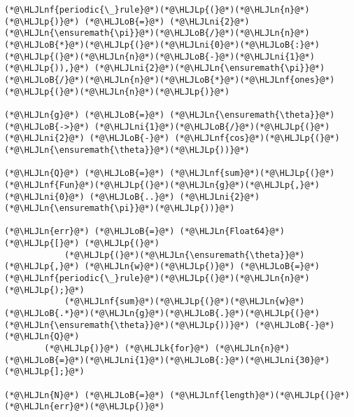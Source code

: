 \documentclass[12pt,a4paper]{article}
\newcommand{\HLJLk}[1]{\textcolor[RGB]{148,91,176}{\textbf{#1}}}
\newcommand{\HLJLn}[1]{#1}
\newcommand{\HLJLnf}[1]{\textcolor[RGB]{66,102,213}{#1}}
\newcommand{\HLJLni}[1]{\textcolor[RGB]{59,151,46}{#1}}
\newcommand{\HLJLoB}[1]{\textcolor[RGB]{102,102,102}{\textbf{#1}}}
\newcommand{\HLJLp}[1]{#1}
\begin{document}
\begin{lstlisting}
(*@\HLJLnf{periodic{\_}rule}@*)(*@\HLJLp{(}@*)(*@\HLJLn{n}@*)(*@\HLJLp{)}@*) (*@\HLJLoB{=}@*) (*@\HLJLni{2}@*)(*@\HLJLn{\ensuremath{\pi}}@*)(*@\HLJLoB{/}@*)(*@\HLJLn{n}@*)(*@\HLJLoB{*}@*)(*@\HLJLp{(}@*)(*@\HLJLni{0}@*)(*@\HLJLoB{:}@*)(*@\HLJLp{(}@*)(*@\HLJLn{n}@*)(*@\HLJLoB{-}@*)(*@\HLJLni{1}@*)(*@\HLJLp{)),}@*) (*@\HLJLni{2}@*)(*@\HLJLn{\ensuremath{\pi}}@*)(*@\HLJLoB{/}@*)(*@\HLJLn{n}@*)(*@\HLJLoB{*}@*)(*@\HLJLnf{ones}@*)(*@\HLJLp{(}@*)(*@\HLJLn{n}@*)(*@\HLJLp{)}@*)

(*@\HLJLn{g}@*) (*@\HLJLoB{=}@*) (*@\HLJLn{\ensuremath{\theta}}@*) (*@\HLJLoB{->}@*) (*@\HLJLni{1}@*)(*@\HLJLoB{/}@*)(*@\HLJLp{(}@*)(*@\HLJLni{2}@*) (*@\HLJLoB{-}@*) (*@\HLJLnf{cos}@*)(*@\HLJLp{(}@*)(*@\HLJLn{\ensuremath{\theta}}@*)(*@\HLJLp{))}@*)

(*@\HLJLn{Q}@*) (*@\HLJLoB{=}@*) (*@\HLJLnf{sum}@*)(*@\HLJLp{(}@*)(*@\HLJLnf{Fun}@*)(*@\HLJLp{(}@*)(*@\HLJLn{g}@*)(*@\HLJLp{,}@*) (*@\HLJLni{0}@*) (*@\HLJLoB{..}@*) (*@\HLJLni{2}@*)(*@\HLJLn{\ensuremath{\pi}}@*)(*@\HLJLp{))}@*)

(*@\HLJLn{err}@*) (*@\HLJLoB{=}@*) (*@\HLJLn{Float64}@*)(*@\HLJLp{[}@*) (*@\HLJLp{(}@*)
            (*@\HLJLp{(}@*)(*@\HLJLn{\ensuremath{\theta}}@*)(*@\HLJLp{,}@*) (*@\HLJLn{w}@*)(*@\HLJLp{)}@*) (*@\HLJLoB{=}@*) (*@\HLJLnf{periodic{\_}rule}@*)(*@\HLJLp{(}@*)(*@\HLJLn{n}@*)(*@\HLJLp{);}@*)
            (*@\HLJLnf{sum}@*)(*@\HLJLp{(}@*)(*@\HLJLn{w}@*)(*@\HLJLoB{.*}@*)(*@\HLJLn{g}@*)(*@\HLJLoB{.}@*)(*@\HLJLp{(}@*)(*@\HLJLn{\ensuremath{\theta}}@*)(*@\HLJLp{))}@*) (*@\HLJLoB{-}@*) (*@\HLJLn{Q}@*)
        (*@\HLJLp{)}@*) (*@\HLJLk{for}@*) (*@\HLJLn{n}@*)(*@\HLJLoB{=}@*)(*@\HLJLni{1}@*)(*@\HLJLoB{:}@*)(*@\HLJLni{30}@*)(*@\HLJLp{];}@*)

(*@\HLJLn{N}@*) (*@\HLJLoB{=}@*) (*@\HLJLnf{length}@*)(*@\HLJLp{(}@*)(*@\HLJLn{err}@*)(*@\HLJLp{)}@*)


\end{lstlisting}
\end{document}
